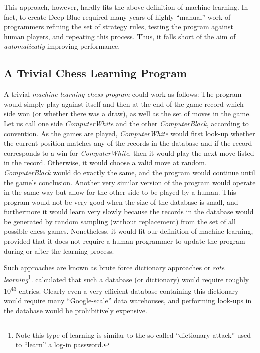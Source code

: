 This approach, however, hardly fits the above definition of machine learning. In fact, to create Deep Blue required many years of highly ``manual'' work of programmers refining the set of strategy rules, testing the program against human players, and repeating this process. Thus, it falls short of the aim of \emph{automatically} improving performance.

\subsection{A Trivial Chess Learning Program}
\label{sec:trivial-learning}

A trivial \emph{machine learning chess program} could work as follows: The program would simply play against itself and then at the end of the game record which side won (or whether there was a draw), as well as the set of moves in the game. Let us call one side \emph{ComputerWhite} and the other \emph{ComputerBlack}, according to convention. As the games are played, \emph{ComputerWhite} would first look-up whether the current position matches any of the records in the database and if the record corresponds to a win for \emph{ComputerWhite}, then it would play the next move listed in the record.  Otherwise, it would choose a valid move at random. \emph{ComputerBlack} would do exactly the same, and the program would continue until the game's conclusion. Another very similar version of the program would operate in the same way but allow for the other side to be played by a human. This program would not be very good when the size of the database is small, and furthermore it would learn very slowly because the records in the database would be generated by random sampling (without replacement) from the set of all possible chess games. Nonetheless, it would fit our definition of machine learning, provided that it does not require a human programmer to update the program during or after the learning process.

Such approaches are known as brute force dictionary approaches or \emph{rote learning}\footnote{Note this type of learning is similar to the so-called ``dictionary attack'' used to ``learn'' a log-in password.}. \cite{shannon1950xxii} calculated that such a database (or dictionary) would require roughly 10\textsuperscript{43} entries. Clearly even a very efficient database containing this dictionary would require many ``Google-scale'' data warehouses, and performing look-ups in the database would be prohibitively expensive.  

